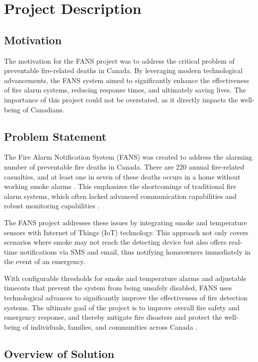 \section{Project Description}

\subsection{Motivation}

The motivation for the FANS project was to address the critical problem of preventable fire-related deaths in Canada.
By leveraging modern technological advancements, the FANS system aimed to significantly enhance the effectiveness of
fire alarm systems, reducing response times, and ultimately saving lives. The importance of this project could not be
overstated, as it directly impacts the well-being of Canadians.

\subsection{Problem Statement}

The Fire Alarm Notification System (FANS) was created to address the alarming number of preventable fire deaths in
Canada. There are 220 annual fire-related casualties, and at least one in seven of these deaths occurs in a home
without working smoke alarms \cite{fire-stats}. This emphasizes the shortcomings of traditional fire alarm systems,
which often lacked advanced communication capabilities and robust monitoring capabilities \cite{modern-fire-alarms}.

The FANS project addresses these issues by integrating smoke and temperature sensors with Internet of Things (IoT)
technology. This approach not only covers scenarios where smoke may not reach the detecting device but also offers
real-time notifications via SMS and email, thus notifying homeowners immediately in the event of an emergency.

With configurable thresholds for smoke and temperature alarms and adjustable timeouts that prevent the system from
being unsafely disabled, FANS uses technological advances to significantly improve the effectiveness of fire detection
systems. The ultimate goal of the project is to improve overall fire safety and emergency response, and thereby
mitigate fire disasters and protect the well-being of individuals, families, and communities across Canada
\cite{smoke-alarm-gc}.

\subsection{Overview of Solution}

